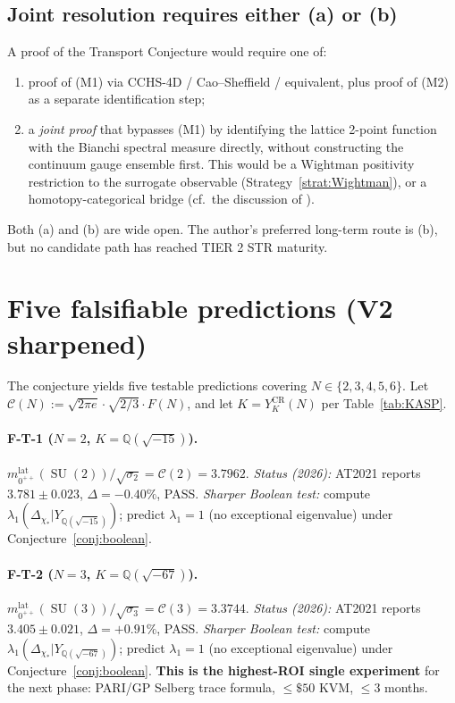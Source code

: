 \documentclass[11pt,a4paper,reqno]{amsart}
\theoremstyle{definition}
\DeclareMathOperator{\SU}{SU}
\newcommand{\YKCR}{Y_K^{\mathrm{CR}}}
\newcommand{\QQ}{\mathbb{Q}}
\begin{document}
\subsection{Joint resolution requires either (a) or (b)}\label{ss:joint}

A proof of the Transport Conjecture would require one of:
\begin{enumerate}[label=(\alph*),leftmargin=2em]
  \item proof of (M1) via CCHS-4D / Cao--Sheffield / equivalent, plus proof of (M2) as a separate identification step;
  \item a \emph{joint proof} that bypasses (M1) by identifying the lattice 2-point function with the Bianchi spectral measure directly, without constructing the continuum gauge ensemble first. This would be a Wightman positivity restriction to the surrogate observable (Strategy~\ref{strat:Wightman}), or a homotopy-categorical bridge (cf.\ the discussion of \cite[Worker 11]{Remondiere2026TransportWaveDigest}).
\end{enumerate}
Both (a) and (b) are wide open. The author's preferred long-term route is (b), but no candidate path has reached TIER 2 STR maturity.

\section{Five falsifiable predictions (V2 sharpened)}\label{sec:falsif}

The conjecture yields five testable predictions covering $N\in\{2,3,4,5,6\}$. Let $\mathcal{C}(N) := \sqrt{2\pi e}\cdot\sqrt{2/3}\cdot F(N)$, and let $K = \YKCR(N)$ per Table~\ref{tab:KASP}.

\paragraph{F-T-1 ($N=2$, $K=\QQ(\sqrt{-15})$).}
$m_{0^{++}}^{\mathrm{lat}}(\SU(2))/\sqrt{\sigma_2} = \mathcal{C}(2) = 3.7962$. \emph{Status (2026):} AT2021 reports $3.781 \pm 0.023$, $\Delta = -0.40\%$, PASS.
\emph{Sharper Boolean test:} compute $\lambda_1(\Delta_{\chi_*}|Y_{\QQ(\sqrt{-15})})$; predict $\lambda_1 = 1$ (no exceptional eigenvalue) under Conjecture~\ref{conj:boolean}.

\paragraph{F-T-2 ($N=3$, $K=\QQ(\sqrt{-67})$).}
$m_{0^{++}}^{\mathrm{lat}}(\SU(3))/\sqrt{\sigma_3} = \mathcal{C}(3) = 3.3744$. \emph{Status (2026):} AT2021 reports $3.405 \pm 0.021$, $\Delta = +0.91\%$, PASS.
\emph{Sharper Boolean test:} compute $\lambda_1(\Delta_{\chi_*}|Y_{\QQ(\sqrt{-67})})$; predict $\lambda_1 = 1$ (no exceptional eigenvalue) under Conjecture~\ref{conj:boolean}. \textbf{This is the highest-ROI single experiment} for the next phase: PARI/GP Selberg trace formula, $\leq \$50$ KVM, $\leq 3$ months.
\end{document}
